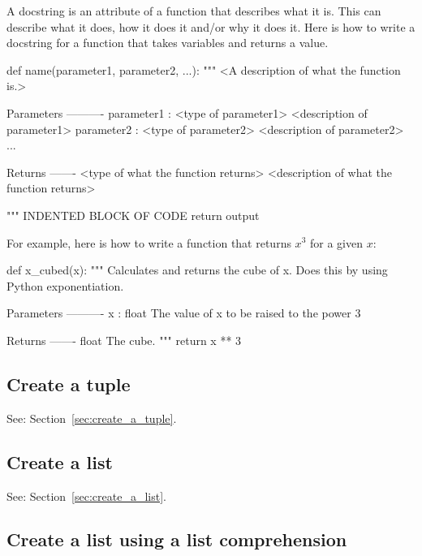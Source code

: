 A docstring is an attribute of a function that describes what it is. This can
describe what it does, how it does it and/or why it does it.
Here is how to write a docstring for a function that takes variables and returns
a value.


\begin{api}
def name(parameter1, parameter2, ...):
    """
    <A description of what the function is.>

    Parameters
    ----------
    parameter1 : <type of parameter1>
        <description of parameter1>
    parameter2 : <type of parameter2>
        <description of parameter2>
    ...

    Returns
    -------
    <type of what the function returns>
        <description of what the function returns>

    """
    INDENTED BLOCK OF CODE
    return output
\end{api}



For example, here is how to write a function that returns \(x ^ 3\) for a given
\(x\):




\begin{pyin}
def x_cubed(x):
    """
    Calculates and returns the cube of x. Does this by using Python
    exponentiation.

    Parameters
    ----------
    x : float
        The value of x to be raised to the power 3

    Returns
    -------
    float
        The cube.
    """
    return x ** 3
\end{pyin}





\subsection{Create a tuple}

See: Section~\ref{sec:create_a_tuple}.



\subsection{Create a list}

See: Section~\ref{sec:create_a_list}.


\subsection{Create a list using a list comprehension}

